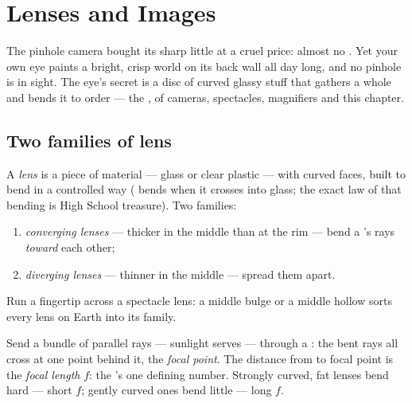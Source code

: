 \chapter{Lenses and Images}\label{ch:g8:lenses-images}

The pinhole camera bought its sharp little  at a cruel
price: almost no . Yet your own eye paints a bright, crisp
world on its back wall all day long, and no pinhole is in
sight. The eye's secret is a disc of curved glassy stuff that
gathers a whole  and bends it to order --- the , 
of cameras, spectacles, magnifiers and this chapter.

\section{Two families of lens}

\begin{definition}\label{def:g8:lenses-images:families}
A \emph{lens} is a piece of  material
--- glass or clear plastic --- with curved faces, built to
bend  in a controlled way ( bends when it crosses
into glass; the exact law of that bending is High School
treasure). Two families:
\begin{enumerate}
  \item \emph{converging lenses} ---
        thicker in the middle than at the rim --- bend a 's
        rays \emph{toward} each other;
  \item \emph{diverging lenses} ---
        thinner in the middle --- spread them apart.
\end{enumerate}
Run a fingertip across a spectacle lens: a middle bulge or a
middle hollow sorts every lens on Earth into its family.
\end{definition}

\begin{definition}\label{def:g8:lenses-images:focus}
Send a bundle of parallel rays --- sunlight serves --- through
a : the bent rays all cross at one point behind
it, the \emph{focal point}. The distance
from  to focal point is the \emph{focal
length} $f$: the 's one defining
number. Strongly curved, fat lenses bend hard --- short $f$;
gently curved ones bend little --- long $f$.
\end{definition}

